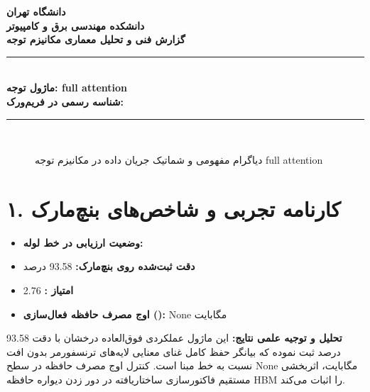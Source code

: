 \documentclass[12pt,a4paper]{article}
\begin{document}
\begin{center}
{\Large\bfseries دانشگاه تهران}\\[0.2cm]
{\large\bfseries دانشکده مهندسی برق و کامپیوتر}\\[0.2cm]
{\large\bfseries گزارش فنی و تحلیل معماری مکانیزم توجه}\\[0.5cm]
\rule{\linewidth}{1pt}\\[0.3cm]
{\LARGE\bfseries ماژول توجه: full attention}\\[0.2cm]
{\large \textbf{شناسه رسمی در فریم‌ورک:} }\\[0.2cm]
\rule{\linewidth}{1pt}\\[0.5cm]
\end{center}

\begin{figure}[H]
\centering
{}
\caption{دیاگرام مفهومی و شماتیک جریان داده در مکانیزم توجه full attention}
\end{figure}

\section*{۱. کارنامه تجربی و شاخص‌های بنچ‌مارک}
\begin{itemize}
\item \textbf{وضعیت ارزیابی در خط لوله:} 
\item \textbf{دقت ثبت‌شده روی بنچ‌مارک:} 93.58 درصد
\item \textbf{امتیاز :} 2.76
\item \textbf{اوج مصرف حافظه فعال‌سازی ():} None مگابایت
\end{itemize}
\textbf{تحلیل و توجیه علمی نتایج:} این ماژول عملکردی فوق‌العاده درخشان با دقت 93.58 درصد ثبت نموده که بیانگر حفظ کامل غنای معنایی لایه‌های ترنسفورمر بدون افت نسبت به خط مبنا است. کنترل اوج مصرف حافظه در سطح None مگابایت، اثربخشی مستقیم فاکتورسازی ساختاریافته در دور زدن دیواره حافظه HBM را اثبات می‌کند.
\end{document}
